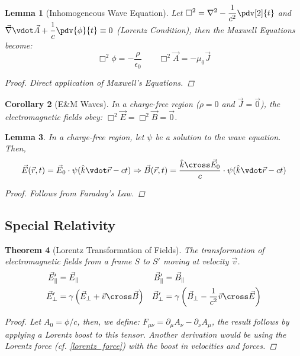 \documentclass[12pt]{article}
\let\RA\Rightarrow
\renewcommand{\div}{\vec{\nabla}\vdot}
\newcommand*{\lapl}{\nabla^2}
\newcommand*{\rv}{\vec{r}}
\newcommand*{\vE}{\vec{E}}
\newcommand*{\vB}{\vec{B}}
\newcommand*{\vJ}{\vec{J}}
\newcommand*{\vA}{\vec{A}}
\newcommand*{\ee}{\epsilon_0}
\newcommand*{\mmu}{\mu_0}
\newtheorem{theorem}{Theorem}[subsection]
\newtheorem{lemma}[theorem]{Lemma}
\newtheorem{corollary}[theorem]{Corollary}
\begin{document}
\begin{lemma}[Inhomogeneous Wave Equation]
  Let $\displaystyle\Box^2=\lapl-\frac{1}{c^2}\pdv[2]{t}$ and $\displaystyle\div\vA+\frac{1}{c} \pdv{\phi}{t} \equiv 0$ (Lorentz Condition), then the Maxwell Equations become: $$\Box^2\phi=-\frac{\rho}{\ee}\qquad\Box^2\vA=-\mmu\vJ$$ 
  \begin{proof}
    Direct application of Maxwell's Equations.
  \end{proof}
\end{lemma}

\begin{corollary}[E\&M Waves]
  In a charge-free region ($\rho=0$ and $\vJ=\vec{0}$), the electromagnetic fields obey: $\Box^2\vE=\Box^2\vB=\vec{0}$.
\end{corollary}

\begin{lemma}
  In a charge-free region, let $\psi$ be a solution to the wave equation. Then, $$\vE(\rv,t)=\vE_0\cdot \psi(\hat{k}\vdot\rv-ct)\RA\vB(\rv,t)=\frac{\hat{k}\cross\vE_0}{c}\cdot \psi(\hat{k}\vdot\rv-ct)$$
  \begin{proof}
    Follows from Faraday's Law.
  \end{proof}
\end{lemma}

\pagebreak

\subsection{Special Relativity}

\begin{theorem}[Lorentz Transformation of Fields]
  The transformation of electromagnetic fields from a frame $S$ to $S'$ moving at velocity $\vec{v}$.
  \begin{align*}
    \vE_{\parallel}'&=\vE_{\parallel} &
    \vB_{\parallel}'&=\vB_{\parallel} \\
    \vE_{\perp}'&=\gamma \left(\vE_{\perp}+\vec{v}\cross\vB \right)&
    \vB_{\perp}'&=\gamma \left(\vB_{\perp}-\frac{1}{c^2} \vec{v}\cross\vE \right)
  \end{align*}
  \begin{proof}
    Let $A_0=\phi/c$, then, we define: $F_{\mu\nu} = \partial_\mu A_\nu - \partial_\nu A_\mu$, the result follows by applying a Lorentz boost to this tensor. Another derivation would be using the Lorentz force (cf. \ref{lorentz_force}) with the boost in velocities and forces.
  \end{proof}
\end{theorem}
\end{document}
